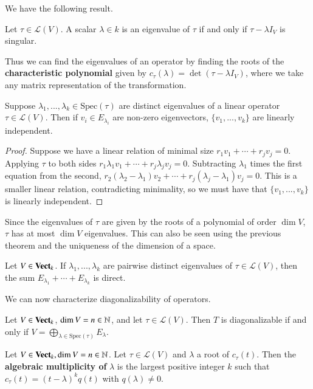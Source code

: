 We have the following result.

\begin{theorem}
    Let $\tau \in \mathcal{L}(V)$. A scalar $\lambda \in k$ is an eigenvalue of $\tau$ if and only if $\tau - \lambda I_V$ is singular.
\end{theorem}

Thus we can find the eigenvalues of an operator by finding the roots of the \textbf{characteristic polynomial} given by $c_{\tau}(\lambda) = \det(\tau-\lambda I_V)$, where we take any matrix representation of the transformation.

\begin{theorem}
    Suppose $\lambda_1,...,\lambda_k \in \text{Spec}(\tau)$ are distinct eigenvalues of a linear operator $\tau \in \mathcal{L}(V)$. Then if $v_i \in E_{\lambda_i}$ are non-zero eigenvectors, $\{v_1,...,v_k\}$ are linearly independent.
\end{theorem}
\begin{proof}
    Suppose we have a linear relation of minimal size $r_1v_1+\cdots+r_jv_j = 0$. Applying $\tau$ to both sides $r_1\lambda_1v_1+\cdots+r_j\lambda_jv_j = 0$. Subtracting $\lambda_1$ times the first equation from the second, $r_2(\lambda_2-\lambda_1)v_2+\cdots+r_j(\lambda_j-\lambda_1)v_j = 0$. This is a smaller linear relation, contradicting minimality, so we must have that $\{v_1,...,v_k\}$ is linearly independent.
\end{proof}

Since the eigenvalues of $\tau$ are given by the roots of a polynomial of order $\dim V$, $\tau$ has at most $\dim V$ eigenvalues. This can also be seen using the previous theorem and the uniqueness of the dimension of a space.

\begin{corollary}
    Let $V \in \normalfont\textbf{Vect}_{k}$. If $\lambda_1,...,\lambda_k$ are pairwise distinct eigenvalues of $\tau \in \mathcal{L}(V)$, then the sum $E_{\lambda_1}+\cdots+E_{\lambda_k}$ is direct.
\end{corollary}

We can now characterize diagonalizability of operators.

\begin{theorem}
    Let $V \in \normalfont\textbf{Vect}_{k}$, $\dim V = n \in \mathbb N$, and let $\tau \in \mathcal{L}(V)$. Then $T$ is diagonalizable if and only if $V = \bigoplus_{\lambda \in \text{Spec}(\tau)}E_{\lambda}$.
\end{theorem}

\begin{definition}
    Let $V \in \normalfont\textbf{Vect}_{k}, \dim V = n\in \mathbb N$. Let $\tau \in \mathcal{L}(V)$ and $\lambda$ a root of $c_{\tau}(t)$. Then the \textbf{algebraic multiplicity of} $\lambda$ is the largest positive integer $k$ such that $c_{\tau}(t) = (t-\lambda)^kq(t)$ with $q(\lambda) \neq 0$.
\end{definition}

